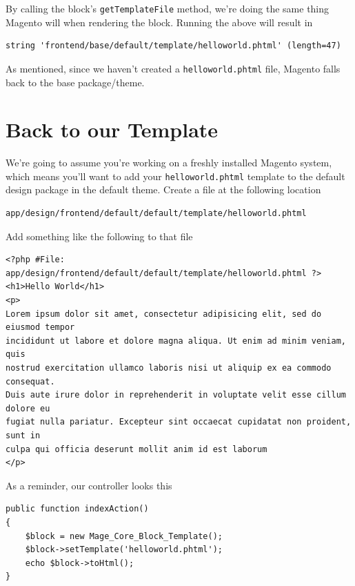 \documentclass[oneside]{book}
\begin{document}
By calling the block's \footnotesize\texttt{getTemplateFile} \normalsize  method, we're doing the same thing Magento will when rendering the block.  Running the above will result in

\begin{lstlisting}
string 'frontend/base/default/template/helloworld.phtml' (length=47)

\end{lstlisting}


As mentioned, since we haven't created a \footnotesize\texttt{helloworld.phtml} \normalsize  file, Magento falls back to the base package/theme.

\section{Back to our Template}

We're going to assume you're working on a freshly installed Magento system, which means you'll want to add your \footnotesize\texttt{helloworld.phtml} \normalsize  template to the default design package in the default theme.  Create a file at the following location

\begin{lstlisting}
app/design/frontend/default/default/template/helloworld.phtml

\end{lstlisting}


Add something like the following to that file

\begin{lstlisting}
<?php #File: app/design/frontend/default/default/template/helloworld.phtml ?>
<h1>Hello World</h1>
<p>
Lorem ipsum dolor sit amet, consectetur adipisicing elit, sed do eiusmod tempor
incididunt ut labore et dolore magna aliqua. Ut enim ad minim veniam, quis
nostrud exercitation ullamco laboris nisi ut aliquip ex ea commodo consequat.
Duis aute irure dolor in reprehenderit in voluptate velit esse cillum dolore eu
fugiat nulla pariatur. Excepteur sint occaecat cupidatat non proident, sunt in
culpa qui officia deserunt mollit anim id est laborum
</p>

\end{lstlisting}


As a reminder, our controller looks this

\begin{lstlisting}
public function indexAction()
{
    $block = new Mage_Core_Block_Template();
    $block->setTemplate('helloworld.phtml');
    echo $block->toHtml();
}

\end{lstlisting}
\end{document}
